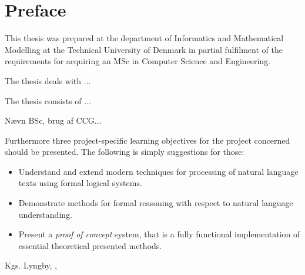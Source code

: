
\chapter{Preface}

This thesis was prepared at the department of Informatics and Mathematical Modelling at the Technical University of Denmark in partial fulfilment of the
requirements for acquiring an MSc in Computer Science and Engineering. 

The thesis deals with ... 

The thesis consists of ...

Nævn BSc, brug af CCG...

Furthermore three project-specific learning objectives for the project concerned should be presented. The following is simply suggestions for those:
\begin{itemize}
	\item Understand and extend modern techniques for processing of natural language texts using formal logical systems.

	\item Demonstrate methods for formal reasoning with respect to natural language understanding.
	
	\item Present a \emph{proof of concept} system, that is a fully functional implementation of essential theoretical presented methods.
\end{itemize}

\vspace{20mm}
\begin{center}
	\hspace{20mm} Kgs. Lyngby, \thesishandin, \thesisyear 
	\vspace{5mm}
	\newline
 

\end{center}
\begin{flushright}
	\vspace{6em}
	\thesisauthor
\end{flushright}
